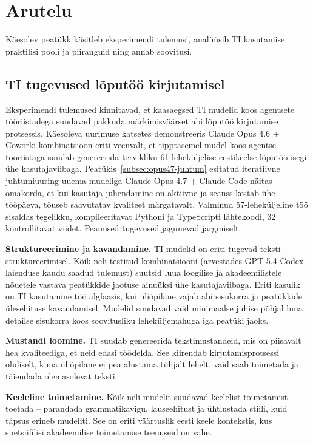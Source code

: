 \section{Arutelu} \label{arutelu}

Käesolev peatükk käsitleb eksperimendi tulemusi, analüüsib TI kasutamise praktilisi pooli ja piiranguid ning annab soovitusi.

\subsection{TI tugevused lõputöö kirjutamisel} \label{subsec:tugevused}

Eksperimendi tulemused kinnitavad, et kaasaegsed TI mudelid koos agentsete tööriistadega suudavad pakkuda märkimisväärset abi lõputöö kirjutamise protsessis. Käesoleva uurimuse katsetes demonstreeris Claude Opus 4.6 + Coworki kombinatsioon eriti veenvalt, et tipptasemel mudel koos agentse tööriistaga suudab genereerida tervikliku 61-leheküljelise eestikeelse lõputöö isegi ühe kasutajaviibaga. Peatükis~\ref{subsec:opus47-juhtum} esitatud iteratiivne juhtumiuuring uuema mudeliga Claude Opus 4.7 + Claude Code näitas omakorda, et kui kasutaja juhendamine on aktiivne ja seanss kestab ühe tööpäeva, tõuseb saavutatav kvaliteet märgatavalt. Valminud 57-leheküljeline töö sisaldas tegelikku, kompileeritavat Pythoni ja TypeScripti lähtekoodi, 32 kontrollitavat viidet. Peamised tugevused jagunevad järgmiselt.

\textbf{Struktureerimine ja kavandamine.} TI mudelid on eriti tugevad teksti struktureerimisel. Kõik neli testitud kombinatsiooni (arvestades GPT-5.4 Codex-laienduse kaudu saadud tulemust) suutsid luua loogilise ja akadeemilistele nõuetele vastava peatükkide jaotuse ainuüksi ühe kasutajaviibaga. Eriti kasulik on TI kasutamine töö algfaasis, kui üliõpilane vajab abi sisukorra ja peatükkide ülesehituse kavandamisel. Mudelid suudavad vaid minimaalse juhise põhjal luua detailse sisukorra koos soovitusliku leheküljemahuga iga peatüki jaoks.

\textbf{Mustandi loomine.} TI suudab genereerida tekstimustandeid, mis on piisavalt hea kvaliteediga, et neid edasi töödelda. See kiirendab kirjutamisprotsessi oluliselt, kuna üliõpilane ei pea alustama tühjalt lehelt, vaid saab toimetada ja täiendada olemasolevat teksti.

\textbf{Keeleline toimetamine.} Kõik neli mudelit suudavad keelelist toimetamist toetada -- parandada grammatikavigu, lauseehitust ja ühtlustada stiili, kuid täpsus erineb mudeliti. See on eriti väärtuslik eesti keele kontekstis, kus spetsiifilisi akadeemilise toimetamise teenuseid on vähe.

